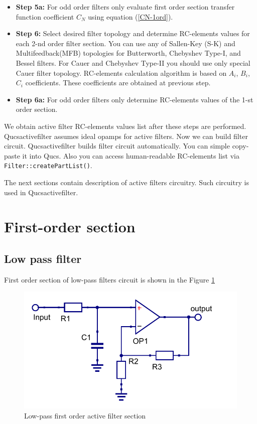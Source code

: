 \begin{itemize}
\item \textbf{Step 5a:} For odd order filters only evaluate first order
section transfer function coefficient $C_N$ using equation (\ref{CN-1ord}).

\item \textbf{Step 6:} Select desired filter topology and determine RC-elements
values for each 2-nd order filter section. You can use any of Sallen-Key (S-K)
and Multifeedback(MFB) topologies for Butterworth, Chebyshev Type-I, and Bessel
filters. For Cauer and Chebyshev Type-II you should use only special Cauer
filter topology. RC-elements calculation algorithm is based on $A_i$, $B_i$,
$C_i$ coefficients. These coefficients are obtained at previous step.

\item \textbf{Step 6a:} For odd order filters only determine RC-elements values
of the 1-st order section. 

\end{itemize}

We obtain active filter RC-elements values list after these steps are
performed. Qucsactivefilter assumes ideal opamps for active filters. Now we can
build filter circuit. Qucsactivefilter builds filter circuit automatically. You
can simple copy-paste it into Qucs. Also you can access human-readable
RC-elements list via \verb|Filter::createPartList()|.

The next sections contain description of active filters circuitry. Such
circuitry is used in Qucsactivefilter.

\section{First-order section}

\subsection{Low pass filter}

First order section of low-pass filters circuit is shown in the Figure
\ref{fig:first-ord-lpf}

\begin{figure}[!ht]
  \centering
  \includegraphics[width=0.5\linewidth]{pics/first-ord-lpf}
  \caption{Low-pass first order active filter section}
  \label{fig:first-ord-lpf}
\end{figure}

